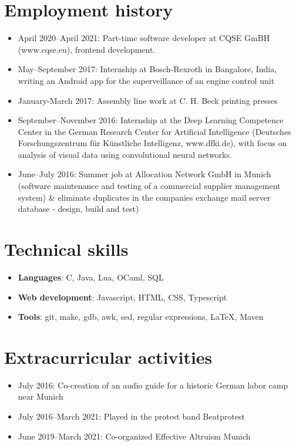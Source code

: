\documentclass[11pt,a4paper]{article}
\begin{document}
\vspace{-10pt}

\section*{Employment history}
\begin{itemize}
	\setlength{\itemsep}{-2pt}
	\item April 2020–April 2021: Part-time software developer at CQSE GmBH (www.cqse.eu), frontend development.
	\item May–September 2017: Internship at Bosch-Rexroth in Bangalore, India, writing an Android app for the superveillance of an engine control unit
	\item January-March 2017: Assembly line work at C. H. Beck printing presses
	\item September–November 2016: Internship at the Deep Learning Competence Center in the German Research Center for Artificial Intelligence
	(Deutsches Forschungszentrum für Künstliche Intelligenz, www.dfki.de), with focus on analysis of
	visual data using convolutional neural networks.
	\item June–July 2016: Summer job at Allocation Network GmbH in Munich (software maintenance and testing of a commercial supplier management system) \& eliminate duplicates in the companies exchange mail
	server database - design, build and test)
\end{itemize}

\vspace{-10pt}

\section*{Technical skills}
\begin{itemize}
	\setlength{\itemsep}{1pt}
	\item[]{\bf Languages}: C, Java, Lua, OCaml, SQL
	\item[]{\bf Web development}: Javascript, HTML, CSS, Typescript
	\item[]{\bf Tools}: git, make, gdb, awk, sed, regular expressions, LaTeX, Maven
\end{itemize}

\vspace{-10pt}

\section*{Extracurricular activities}
\begin{itemize}
	\setlength{\itemsep}{1pt}
	\item July 2016: Co-creation of an audio guide for a historic German labor camp near Munich
	\item July 2016–March 2021: Played in the protest band Beatprotest
	\item June 2019–March 2021: Co-organized Effective Altruism Munich
\end{itemize}
\end{document}
